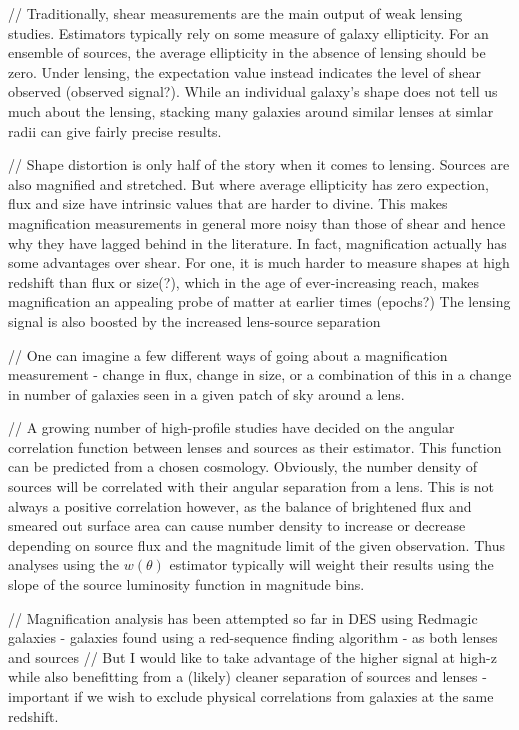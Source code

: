 // Traditionally, shear measurements are the main output of weak lensing studies. Estimators typically rely on some measure of galaxy ellipticity. For an ensemble of sources, the average ellipticity in the absence of lensing should be zero. Under lensing, the expectation value instead indicates the level of shear observed (observed signal?). While an individual galaxy's shape does not tell us much about the lensing, stacking many galaxies around similar lenses at simlar radii can give fairly precise results. %

// Shape distortion is only half of the story when it comes to lensing. Sources are also magnified and stretched. But where average ellipticity has zero expection, flux and size have intrinsic values that are harder to divine. This makes magnification measurements in general more noisy than those of shear and hence why they have lagged behind in the literature. In fact, magnification actually has some advantages over shear. For one, it is much harder to measure shapes at high redshift than flux or size(?), which in the age of ever-increasing reach, makes magnification an appealing probe of matter at earlier times (epochs?) The lensing signal is also boosted by the increased lens-source separation %

// One can imagine a few different ways of going about a magnification measurement - change in flux, change in size, or a combination of this in a change in number of galaxies seen in a given patch of sky around a lens. %

// A growing number of high-profile studies have decided on the angular correlation function between lenses and sources as their estimator. This function can be predicted from a chosen cosmology. Obviously, the number density of sources will be correlated with their angular separation from a lens. This is not always a positive correlation however, as the balance of brightened flux and smeared out surface area can cause number density to increase or decrease depending on source flux and the magnitude limit of the given observation. Thus analyses using the $w(\theta)$ estimator typically will weight their results using the slope of the source luminosity function in magnitude bins. %

// Magnification analysis has been attempted so far in DES using Redmagic galaxies - galaxies found using a red-sequence finding algorithm - as both lenses and sources %
// But I would like to take advantage of the higher signal at high-z while also benefitting from a (likely) cleaner separation of sources and lenses - important if we wish to exclude physical correlations from galaxies at the same redshift. 

